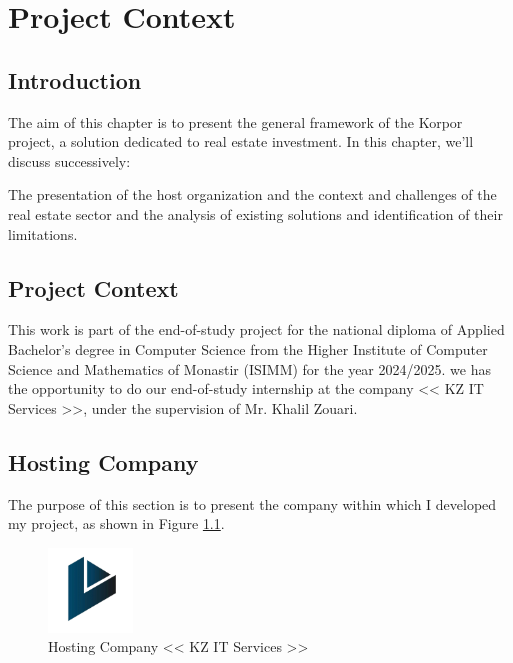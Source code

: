 \chapter{Project Context}

\section*{Introduction}

The aim of this chapter is to present the general framework of the Korpor project, a solution dedicated to real estate investment. In this chapter, we'll discuss successively:

The presentation of the host organization and the context and challenges of the real estate sector and the analysis of existing solutions and identification of their limitations.


\section{Project Context}

This work is part of the end-of-study project for the national diploma of Applied Bachelor's degree in Computer Science from the Higher Institute of Computer Science and Mathematics of Monastir (ISIMM) for the year 2024/2025. we has the opportunity to do our end-of-study internship at the company
<< KZ IT Services >>, under the supervision of Mr. Khalil Zouari.

\section{Hosting Company}

The purpose of this section is to present the company within which I developed my project, as shown in Figure \ref{fig:hosting-company}.

\begin{figure}[htbp]
    \centering
    \includegraphics[width=0.2\textwidth]{images/company-logo.png}
    \caption{Hosting Company << KZ IT Services >>}
    \label{fig:hosting-company}
\end{figure}


